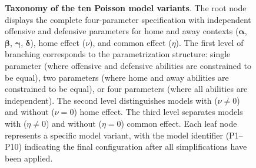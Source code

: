 \begin{figure}[ht]
    \caption{
        \textbf{Taxonomy of the ten Poisson model variants}.
        The root node displays the complete four-parameter specification with independent offensive and defensive parameters for home and away contexts ($\boldsymbol{\alpha}$, $\boldsymbol{\beta}$, $\boldsymbol{\gamma}$, $\boldsymbol{\delta}$), home effect ($\nu$), and common effect ($\eta$).
        The first level of branching corresponds to the parametrization structure: single parameter (where offensive and defensive abilities are constrained to be equal), two parameters (where home and away abilities are constrained to be equal), or four parameters (where all abilities are independent).
        The second level distinguishes models with ($\nu \neq 0$) and without ($\nu = 0$) home effect.
        The third level separates models with ($\eta \neq 0$) and without ($\eta = 0$) common effect.
        Each leaf node represents a specific model variant, with the model identifier (P1--P10) indicating the final configuration after all simplifications have been applied.
    }
    \label{fig:poisson_models_taxonomy}
\end{figure}
